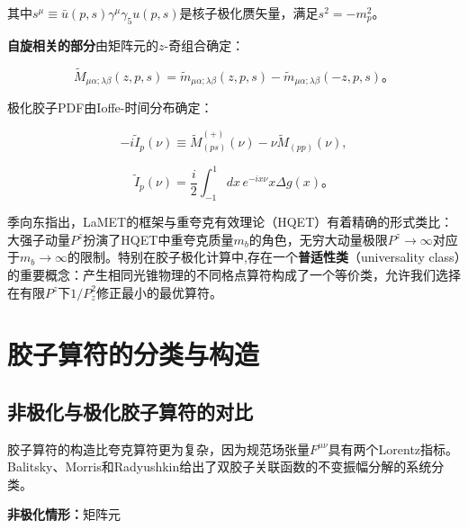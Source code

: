 \documentclass[12pt,a4paper]{ctexart}
\theoremstyle{definition}
\begin{document}
其中$s^\mu \equiv \bar{u}(p,s)\gamma^\mu\gamma_5 u(p,s)$是核子极化赝矢量，满足$s^2 = -m_p^2$。

\textbf{自旋相关的部分}由矩阵元的$z$-奇组合确定\cite{Egerer2022,NoteGluonPDFs}：

\begin{equation}
\tilde{M}_{\mu\alpha;\lambda\beta}(z, p, s) = \tilde{m}_{\mu\alpha;\lambda\beta}(z, p, s) - \tilde{m}_{\mu\alpha;\lambda\beta}(-z, p, s)。
\label{eq:z_odd_combination}
\end{equation}

极化胶子PDF由Ioffe-时间分布确定\cite{Egerer2022}：

\begin{equation}
-i\tilde{I}_p(\nu) \equiv \tilde{M}_{(ps)}^{(+)}(\nu) - \nu \tilde{M}_{(pp)}(\nu),
\label{eq:Ioffe_polarized}
\end{equation}

\begin{equation}
\tilde{I}_p(\nu) = \frac{i}{2} \int_{-1}^{1} dx\, e^{-ix\nu} x \Delta g(x)。
\label{eq:Ioffe_to_Deltag}
\end{equation}


季向东指出\cite{Ji2014LaMET}，LaMET的框架与重夸克有效理论（HQET）有着精确的形式类比：大强子动量$P^z$扮演了HQET中重夸克质量$m_b$的角色，无穷大动量极限$P^z \to \infty$对应于$m_b \to \infty$的限制\cite{Ji2014LaMET}。特别在胶子极化计算中,存在一个\textbf{普适性类}（universality class）的重要概念：产生相同光锥物理的不同格点算符构成了一个等价类，允许我们选择在有限$P^z$下$1/P_z^2$修正最小的最优算符\cite{Ji2017More}。

\section{胶子算符的分类与构造}

\subsection{非极化与极化胶子算符的对比}

胶子算符的构造比夸克算符更为复杂，因为规范场张量$F^{\mu\nu}$具有两个Lorentz指标。Balitsky、Morris和Radyushkin\cite{Balitsky2020}给出了双胶子关联函数的不变振幅分解的系统分类。

\textbf{非极化情形：}矩阵元
\end{document}
